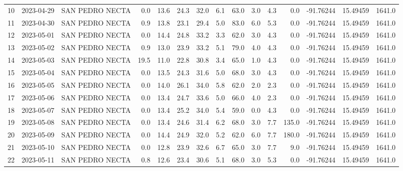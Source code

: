 \documentclass[12pt]{article}
\begin{document}
\begin{center}
\begin{tabular}{lllrrrrrrrrrrrr}
10  & 2023-04-29 &  SAN PEDRO NECTA &     0.0 &  13.6 &   24.3 &  32.0 &        6.1 &     63.0 &  3.0 &         4.3 &         0.0 & -91.76244 &  15.49459 &   1641.0 \\
11  & 2023-04-30 &  SAN PEDRO NECTA &     0.9 &  13.8 &   23.1 &  29.4 &        5.0 &     83.0 &  6.0 &         5.3 &         0.0 & -91.76244 &  15.49459 &   1641.0 \\
12  & 2023-05-01 &  SAN PEDRO NECTA &     0.0 &  14.4 &   24.8 &  33.2 &        3.3 &     62.0 &  3.0 &         4.3 &         0.0 & -91.76244 &  15.49459 &   1641.0 \\
13  & 2023-05-02 &  SAN PEDRO NECTA &     0.9 &  13.0 &   23.9 &  33.2 &        5.1 &     79.0 &  4.0 &         4.3 &         0.0 & -91.76244 &  15.49459 &   1641.0 \\
14  & 2023-05-03 &  SAN PEDRO NECTA &    19.5 &  11.0 &   22.8 &  30.8 &        3.4 &     65.0 &  1.0 &         4.3 &         0.0 & -91.76244 &  15.49459 &   1641.0 \\
15  & 2023-05-04 &  SAN PEDRO NECTA &     0.0 &  13.5 &   24.3 &  31.6 &        5.0 &     68.0 &  3.0 &         4.3 &         0.0 & -91.76244 &  15.49459 &   1641.0 \\
16  & 2023-05-05 &  SAN PEDRO NECTA &     0.0 &  14.0 &   26.1 &  34.0 &        5.8 &     62.0 &  2.0 &         2.3 &         0.0 & -91.76244 &  15.49459 &   1641.0 \\
17  & 2023-05-06 &  SAN PEDRO NECTA &     0.0 &  13.4 &   24.7 &  33.6 &        5.0 &     66.0 &  4.0 &         2.3 &         0.0 & -91.76244 &  15.49459 &   1641.0 \\
18  & 2023-05-07 &  SAN PEDRO NECTA &     0.0 &  13.4 &   25.2 &  34.0 &        5.4 &     59.0 &  0.0 &         4.3 &         0.0 & -91.76244 &  15.49459 &   1641.0 \\
19  & 2023-05-08 &  SAN PEDRO NECTA &     0.0 &  13.4 &   24.6 &  31.4 &        6.2 &     68.0 &  3.0 &         7.7 &       135.0 & -91.76244 &  15.49459 &   1641.0 \\
20  & 2023-05-09 &  SAN PEDRO NECTA &     0.0 &  14.4 &   24.9 &  32.0 &        5.2 &     62.0 &  6.0 &         7.7 &       180.0 & -91.76244 &  15.49459 &   1641.0 \\
21  & 2023-05-10 &  SAN PEDRO NECTA &     0.0 &  12.8 &   23.9 &  32.6 &        6.7 &     65.0 &  3.0 &         7.7 &         9.0 & -91.76244 &  15.49459 &   1641.0 \\
22  & 2023-05-11 &  SAN PEDRO NECTA &     0.8 &  12.6 &   23.4 &  30.6 &        5.1 &     68.0 &  3.0 &         5.3 &         0.0 & -91.76244 &  15.49459 &   1641.0 \\

\end{tabular}
\end{center}
\end{document}
